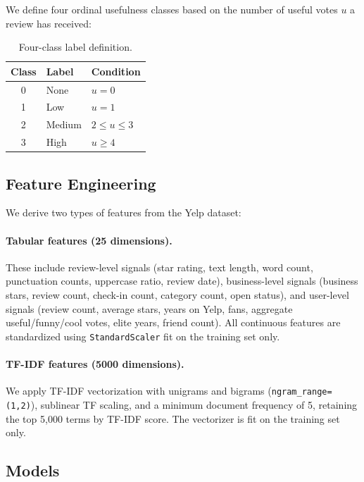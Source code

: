 \documentclass[11pt,a4paper]{article}
\begin{document}
We define four ordinal usefulness classes based on the number of useful
votes $u$ a review has received:

\begin{table}[H]
\centering
\caption{Four-class label definition.}
\begin{tabular}{cll}
\toprule
\textbf{Class} & \textbf{Label} & \textbf{Condition} \\
\midrule
0 & None   & $u = 0$ \\
1 & Low    & $u = 1$ \\
2 & Medium & $2 \leq u \leq 3$ \\
3 & High   & $u \geq 4$ \\
\bottomrule
\end{tabular}
\end{table}

\subsection{Feature Engineering}

We derive two types of features from the Yelp dataset:

\paragraph{Tabular features (25 dimensions).}
These include review-level signals (star rating, text length, word count,
punctuation counts, uppercase ratio, review date), business-level signals
(business stars, review count, check-in count, category count, open
status), and user-level signals (review count, average stars, years on
Yelp, fans, aggregate useful/funny/cool votes, elite years, friend count).
All continuous features are standardized using \texttt{StandardScaler}
fit on the training set only.

\paragraph{TF-IDF features (5000 dimensions).}
We apply TF-IDF vectorization with unigrams and bigrams
(\texttt{ngram\_range=(1,2)}), sublinear TF scaling, and a minimum
document frequency of 5, retaining the top 5{,}000 terms by TF-IDF score.
The vectorizer is fit on the training set only.

\subsection{Models}
\end{document}
